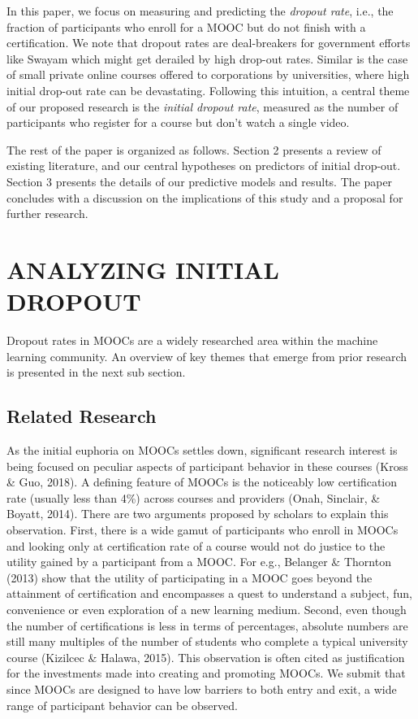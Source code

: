 \documentclass[12pt,]{article}
\begin{document}
In this paper, we focus on measuring and predicting the \emph{dropout
rate}, i.e., the fraction of participants who enroll for a MOOC but do
not finish with a certification. We note that dropout rates are
deal-breakers for government efforts like Swayam which might get
derailed by high drop-out rates. Similar is the case of small private
online courses offered to corporations by universities, where high
initial drop-out rate can be devastating. Following this intuition, a
central theme of our proposed research is the \emph{initial dropout
rate}, measured as the number of participants who register for a course
but don't watch a single video.

The rest of the paper is organized as follows. Section 2 presents a
review of existing literature, and our central hypotheses on predictors
of initial drop-out. Section 3 presents the details of our predictive
models and results. The paper concludes with a discussion on the
implications of this study and a proposal for further research.

\section{ANALYZING INITIAL DROPOUT}\label{analyzing-initial-dropout}

Dropout rates in MOOCs are a widely researched area within the machine
learning community. An overview of key themes that emerge from prior
research is presented in the next sub section.

\subsection{Related Research}\label{related-research}

As the initial euphoria on MOOCs settles down, significant research
interest is being focused on peculiar aspects of participant behavior in
these courses (Kross \& Guo, 2018). A defining feature of MOOCs is the
noticeably low certification rate (usually less than 4\%) across courses
and providers (Onah, Sinclair, \& Boyatt, 2014). There are two arguments
proposed by scholars to explain this observation. First, there is a wide
gamut of participants who enroll in MOOCs and looking only at
certification rate of a course would not do justice to the utility
gained by a participant from a MOOC. For e.g., Belanger \& Thornton
(2013) show that the utility of participating in a MOOC goes beyond the
attainment of certification and encompasses a quest to understand a
subject, fun, convenience or even exploration of a new learning medium.
Second, even though the number of certifications is less in terms of
percentages, absolute numbers are still many multiples of the number of
students who complete a typical university course (Kizilcec \& Halawa,
2015). This observation is often cited as justification for the
investments made into creating and promoting MOOCs. We submit that since
MOOCs are designed to have low barriers to both entry and exit, a wide
range of participant behavior can be observed.
\end{document}
